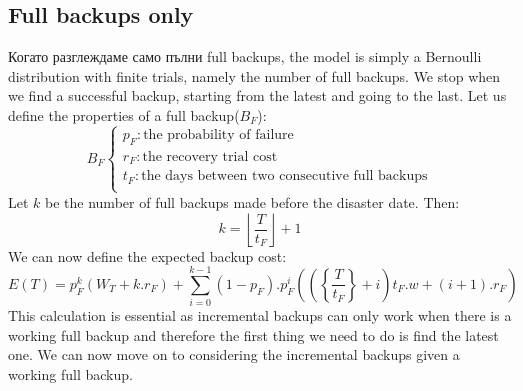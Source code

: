 \documentclass[11pt, a4paper]{article}
\theoremstyle{definition}
\begin{document}
		\subsection{Full backups only}
			Когато разглеждаме само пълни  full backups, the model is simply a Bernoulli distribution with finite trials, namely the number of full backups. We stop when we find a successful backup, starting from the latest and going to the last. Let us define the properties of a full backup($B_F$):
$$
B_F
\begin{cases}
p_F: \text{the probability of failure}\\
r_F: \text{the recovery trial cost}\\
t_F: \text{the days between two consecutive full backups}\\
\end{cases}
$$
Let $k$ be the number of full backups made before the disaster date. Then:
$$
k = \left \lfloor{\frac{T}{t_F}}\right \rfloor + 1
$$
We can now define the expected backup cost:
\begin{equation}
\label{eq:1}
E(T) = p_F^{k}\left(W_T + k.r_F\right) + \displaystyle \sum_{i=0}^{k-1} (1-p_F).p_F^{i}\left( \left (\left\{ \frac{T}{t_F}\right \} + i\right)t_F.w + (i+1).r_F \right )
\end{equation}
This calculation is essential as incremental backups can only work when there is a working full backup and therefore the first thing we need to do is find the latest one. We can now move on to considering the incremental backups given a working full backup.
\end{document}
